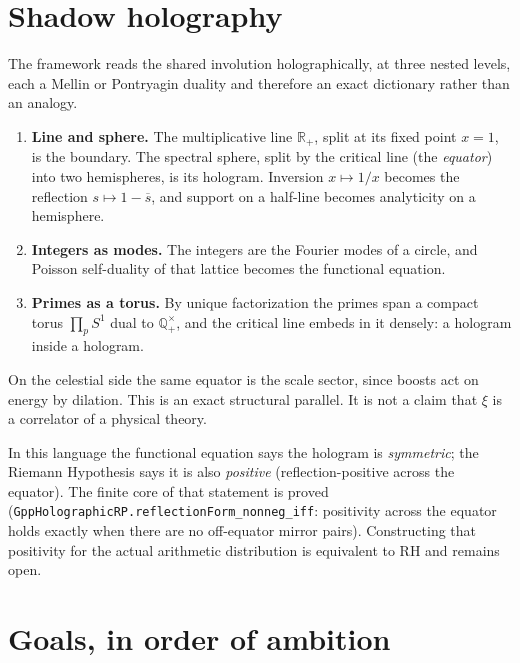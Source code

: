 \documentclass{report}
\theoremstyle{definition}
\begin{document}
\section{Shadow holography}

The framework reads the shared involution holographically, at three nested levels, each a
Mellin or Pontryagin duality and therefore an exact dictionary rather than an analogy.
\begin{enumerate}
  \item \textbf{Line and sphere.} The multiplicative line $\mathbb{R}_+$, split at its fixed
    point $x=1$, is the boundary. The spectral sphere, split by the critical line (the
    \emph{equator}) into two hemispheres, is its hologram. Inversion $x\mapsto 1/x$ becomes
    the reflection $s\mapsto 1-\overline{s}$, and support on a half-line becomes analyticity
    on a hemisphere.
  \item \textbf{Integers as modes.} The integers are the Fourier modes of a circle, and
    Poisson self-duality of that lattice becomes the functional equation.
  \item \textbf{Primes as a torus.} By unique factorization the primes span a compact torus
    $\prod_p S^1$ dual to $\mathbb{Q}_+^\times$, and the critical line embeds in it densely:
    a hologram inside a hologram.
\end{enumerate}
On the celestial side the same equator is the scale sector, since boosts act on energy by
dilation. This is an exact structural parallel. It is not a claim that $\xi$ is a
correlator of a physical theory.

In this language the functional equation says the hologram is \emph{symmetric}; the Riemann
Hypothesis says it is also \emph{positive} (reflection-positive across the equator). The
finite core of that statement is proved
(\texttt{GppHolographicRP.reflectionForm\_nonneg\_iff}: positivity across the equator
holds exactly when there are no off-equator mirror pairs). Constructing that positivity for
the actual arithmetic distribution is equivalent to RH and remains open.

\section{Goals, in order of ambition}
\end{document}
